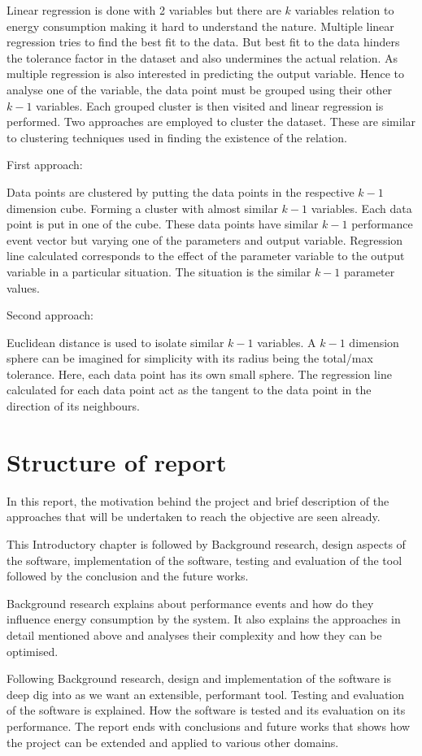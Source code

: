 Linear regression is done with 2 variables but there are \(k\) variables relation to energy consumption making it hard to understand the nature. Multiple linear regression tries to find the best fit to the data. But best fit to the data hinders the tolerance factor in the dataset and also undermines the actual relation. As multiple regression is also interested in predicting the output variable. Hence to analyse one of the variable, the data point must be grouped using their other \(k-1\) variables. Each grouped cluster is then visited and linear regression is performed. Two approaches are employed to cluster the dataset. These are similar to clustering techniques used in finding the existence of the relation.

First approach:

Data points are clustered by putting the data points in the respective \(k-1\) dimension cube. Forming a cluster with almost similar \(k-1\) variables. Each data point is put in one of the cube. These data points have similar \(k-1\) performance event vector but varying one of the parameters and output variable. Regression line calculated corresponds to the effect of the parameter variable to the output variable in a particular situation. The situation is the similar \(k-1\) parameter values.

Second approach:

Euclidean distance is used to isolate similar \(k-1\) variables. A \(k-1\) dimension sphere can be imagined for simplicity with its radius being the total/max tolerance. Here, each data point has its own small sphere. The regression line calculated for each data point act as the tangent to the data point in the direction of its neighbours.

\section{Structure of report}

In this report, the motivation behind the project and brief description of the approaches that will be undertaken to reach the objective are seen already.

This Introductory chapter is followed by Background research, design aspects of the software, implementation of the software, testing and evaluation of the tool followed by the conclusion and the future works.

Background research explains about performance events and how do they influence energy consumption by the system. It also explains the approaches in detail mentioned above and analyses their complexity and how they can be optimised.

Following Background research, design and implementation of the software is deep dig into as we want an extensible, performant tool. Testing and evaluation of the software is explained. How the software is tested and its evaluation on its performance. The report ends with conclusions and future works that shows how the project can be extended and applied to various other domains.